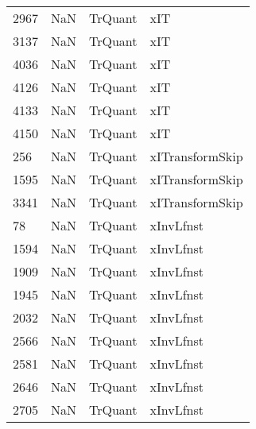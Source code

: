 \begin{tabular}{llll}
2967 &                   NaN &                    TrQuant &                                       xIT \\
3137 &                   NaN &                    TrQuant &                                       xIT \\
4036 &                   NaN &                    TrQuant &                                       xIT \\
4126 &                   NaN &                    TrQuant &                                       xIT \\
4133 &                   NaN &                    TrQuant &                                       xIT \\
4150 &                   NaN &                    TrQuant &                                       xIT \\
256  &                   NaN &                    TrQuant &                           xITransformSkip \\
1595 &                   NaN &                    TrQuant &                           xITransformSkip \\
3341 &                   NaN &                    TrQuant &                           xITransformSkip \\
78   &                   NaN &                    TrQuant &                                 xInvLfnst \\
1594 &                   NaN &                    TrQuant &                                 xInvLfnst \\
1909 &                   NaN &                    TrQuant &                                 xInvLfnst \\
1945 &                   NaN &                    TrQuant &                                 xInvLfnst \\
2032 &                   NaN &                    TrQuant &                                 xInvLfnst \\
2566 &                   NaN &                    TrQuant &                                 xInvLfnst \\
2581 &                   NaN &                    TrQuant &                                 xInvLfnst \\
2646 &                   NaN &                    TrQuant &                                 xInvLfnst \\
2705 &                   NaN &                    TrQuant &                                 xInvLfnst \\

\end{tabular}

